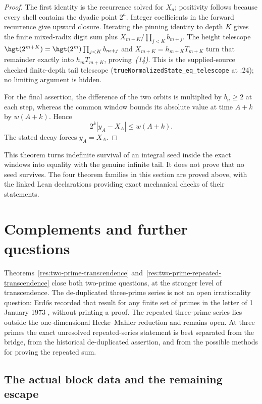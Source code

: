 \begin{proof}
The first identity is the recurrence solved for $X_a$; positivity follows
because every shell contains the dyadic point $2^a$.  Integer coefficients in
the forward recurrence give upward closure.  Iterating the pinning identity to
depth $K$ gives the finite mixed-radix digit sum plus
$X_{m+K}/\prod_{j<K}b_{m+j}$.  The height telescope
$\hgt(2^{m+K})=\hgt(2^m)\prod_{j<K}b_{m+j}$ and
$X_{m+K}=h_{m+K}T_{m+K}$ turn that remainder exactly into $h_mT_{m+K}$,
proving~\emph{(14)}.  This is the supplied-source checked finite-depth tail telescope
(\texttt{trueNormalizedState\_eq\_telescope} at
:24); no limiting
argument is hidden.

For the final assertion, the
difference of the two orbits is multiplied by $b_n\ge2$ at each step, whereas
the common window bounds its absolute value at time $A+k$ by $w(A+k)$.
Hence
\[
 2^k|y_A-X_A|\le w(A+k).
\]
The stated decay forces $y_A=X_A$.
\end{proof}

This theorem turns indefinite survival of an integral seed inside the exact
windows into equality with the genuine infinite tail.  It does not prove that
no seed survives.  The four theorem families in this section are
proved above, with the linked Lean declarations providing exact mechanical
checks of their statements.


\section{Complements and further questions}\label{sec:open}

Theorems~\ref{res:two-prime-transcendence}
and~\ref{res:two-prime-repeated-transcendence} close both two-prime questions,
at the stronger level of transcendence.  The de-duplicated three-prime series
is not an open irrationality question: Erd\H{o}s recorded that result for any
finite set of primes in the letter of 1 January 1973
\cite[p.~335]{erdos1974letter}, without printing a proof.  The repeated
three-prime series lies outside the one-dimensional Hecke--Mahler reduction
and remains open.  At three primes the exact unresolved repeated-series
statement is best separated from the bridge, from the historical de-duplicated
assertion, and from the possible methods for proving the repeated sum.

\subsection{The actual block data and the remaining escape}

